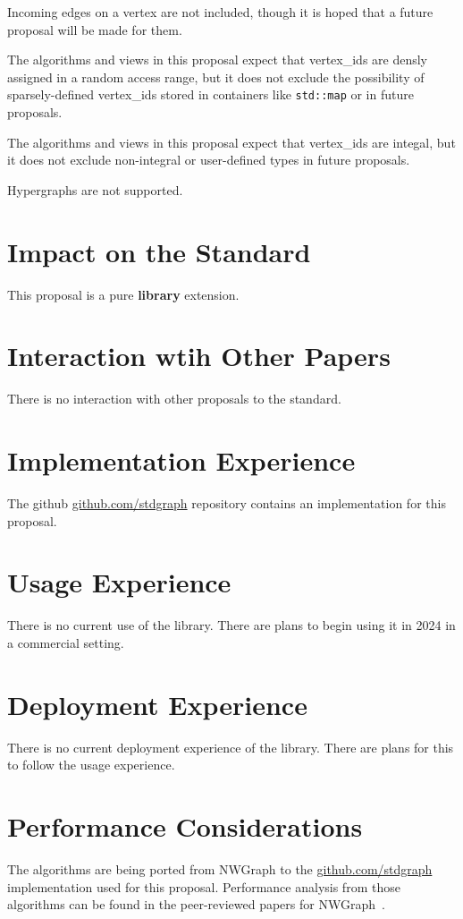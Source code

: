 Incoming edges on a vertex are not included, though it is hoped that a future proposal will be made for them.

The algorithms and views in this proposal expect that vertex\_ids are densly assigned in a random access range, but it does not exclude the possibility of 
sparsely-defined vertex\_ids stored in containers like \lstinline{std::map} or  in future proposals. 

The algorithms and views in this proposal expect that vertex\_ids are integal, but it does not exclude non-integral or user-defined types in future proposals.

Hypergraphs are not supported.

\section{Impact on the Standard}
This proposal is a pure \textbf{library} extension.

\section{Interaction wtih Other Papers}
There is no interaction with other proposals to the standard.

\section{Implementation Experience}
The github \href{https://github.com/stdgraph}{github.com/stdgraph} repository contains an implementation for this proposal.

\section{Usage Experience}
There is no current use of the library. There are plans to begin using it in 2024 in a commercial setting.

\section{Deployment Experience}
There is no current deployment experience of the library. There are plans for this to follow the usage experience.

\section{Performance Considerations}
The algorithms are being ported from NWGraph to the \href{https://github.com/stdgraph}{github.com/stdgraph} implementation used for this proposal. Performance analysis from those algorithms can be found in the peer-reviewed papers for NWGraph~\cite{REF_nwgraph_paper,gapbs_2023}.

